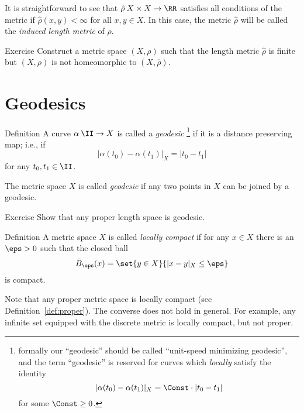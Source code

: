 It is straightforward to see that $\hat \rho\:X\times X\to\RR$ satisfies all conditions of the metric if $\hat \rho(x,y)<\infty$ for all $x,y\in X$.
In this case, the metric $\hat \rho$ will be called the \emph{induced length metric} of $\rho$.

\begin{thm}{Exercise}\label{ex:length-is-not-homeo}
Construct a metric space $(X,\rho)$ such that the length  metric $\hat \rho$ is finite
but $(X,\rho)$ is not homeomorphic to $(X,\hat \rho)$.
\end{thm}


 
\section*{Geodesics}

\begin{thm}{Definition}\label{def:geodesic}
 A curve $\alpha\:\II\to X$ is called a \emph{geodesic}%
\footnote{formally our ``geodesic'' should be called ``unit-speed minimizing geodesic'',
and the term ``geodesic'' is reserved for curves which \emph{locally} satisfy the identity
$$|\alpha(t_0)-\alpha(t_1)|_X=\Const\cdot|t_0-t_1|$$
for some $\Const\ge 0$.}
 if it is a distance preserving map;
i.e., if 
$$|\alpha(t_0)-\alpha(t_1)|_X=|t_0-t_1|$$
for any $t_0,t_1\in\II$.

The metric space $X$ is called \emph{geodesic}
if any two points in $X$ can be joined by a geodesic. 
\end{thm}





\begin{thm}{Exercise}\label{ex:proper=>geodesic}
Show that any proper length space is geodesic.
\end{thm}

\begin{thm}{Definition}
A metric space $X$ is called \emph{locally compact} if for any $x\in X$ there is an $\eps>0$ such that the closed ball
$$\bar B_\eps(x)=\set{y\in X}{|x-y|_X\le \eps}$$
is compact.
\end{thm}

Note that any proper metric space is locally compact (see Definition~\ref{def:proper}).
The converse does not hold in general.
For example, any infinite set equipped with the discrete metric is locally compact, but not proper.

